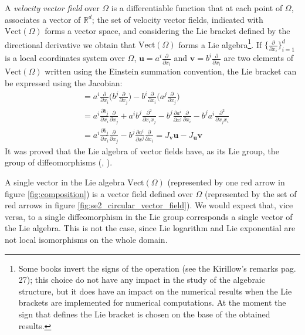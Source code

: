 A \emph{velocity vector field} over $\Omega$ is a differentiable function that at each point of $\Omega$, associates a vector of $\mathbb{R}^d$; the set of velocity vector fields, indicated with $\text{Vect}(\Omega)$ forms a vector space, and considering the Lie bracket defined by the directional derivative
we obtain that $\text{Vect}(\Omega)$ forms a Lie algebra\footnote{
	Some books invert the signs of the operation (see the Kirillow's remarks \cite{kirillov2008introduction} pag. 27); this choice do not have any impact in the study of the algebraic structure, but it does have an impact on the numerical results when the Lie brackets are implemented for numerical computations. At the moment the sign that defines the Lie bracket is chosen on the base of the obtained results.
}.
If $\{\frac{\partial}{\partial x_{i}}\}_{i=1}^{d}$ is a local coordinates system over $\Omega$, $\mathbf{u}=a^{i} \frac{\partial}{\partial x_{i}}$ and $\mathbf{v}=b^{i} \frac{\partial}{\partial x_{i}}$ are two elements of  $\text{Vect}(\Omega)$ written using the Einstein summation convention, the Lie bracket can be expressed using the Jacobian:
\begin{align*}
[\mathbf{u}, \mathbf{v}] &= 
a^{i} \frac{\partial}{\partial x_{i}}\big( b^{j} \frac{\partial}{\partial x_{j}} \big)
-
b^{i} \frac{\partial}{\partial x_{i}}\big( a^{j} \frac{\partial}{\partial x_{j}} \big) \\
&=
a^{i} \frac{\partial b_{j}}{\partial x_{i}}\frac{\partial}{\partial x_{j}}  
+ 
a^{i}b^{j}\frac{\partial^{2}}{\partial x_{i}x_{j}}
- 
b^{j} \frac{\partial a^{i}}{\partial x^{j}}\frac{\partial}{\partial x_{i}} 
-
b^{j}a^{i}\frac{\partial^{2}}{\partial x_{j}x_{i}} \\
&=
a^{i} \frac{\partial b_{j}}{\partial x_{i}}\frac{\partial}{\partial x_{j}}
-
b^{j} \frac{\partial a^{i}}{\partial x^{j}}\frac{\partial}{\partial x_{i}} 
= J_{\mathbf{v}}\mathbf{u} - J_{\mathbf{u}}\mathbf{v}
\end{align*}
It was proved that the Lie algebra of vector fields have, as its Lie group, the group of diffeomorphisms (\cite{milnor1982infinite}, \cite{ovsienko1992integrals}). 

A single vector in the Lie algebra $\text{Vect}(\Omega)$ (represented by one red arrow in figure \ref{fig:composition}) is a vector field defined over $\Omega$ (represented by the set of red arrows in figure \ref{fig:se2_circular_vector_field}). We would expect that, vice versa, to a single diffeomorphism in the Lie group corresponds a single vector of the Lie algebra. This is not the case, since Lie logarithm and Lie exponential are not local isomorphisms on the whole domain.

